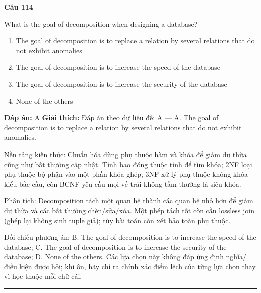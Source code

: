 \documentclass[11pt,a4paper]{article}
\newenvironment{question}[1]{%
  \par\vspace{1em}\noindent\textbf{\large Câu #1}\par\vspace{0.4em}
}{%
  \par\vspace{1em}\hrule\vspace{0.6em}
}
\newenvironment{choices}{%
  \begin{enumerate}[label=\textbf{\Alph*.},leftmargin=2.2em,itemsep=2pt,topsep=3pt]
}{%
  \end{enumerate}
}
\newcommand{\choice}{\item}
\begin{document}
\begin{question}{114}
What is the goal of decomposition when designing a database?
\begin{choices}
\choice The goal of decomposition is to replace a relation by several relations that do not exhibit anomalies
\choice The goal of decomposition is to increase the speed of the database
\choice The goal of decomposition is to increase the security of the database
\choice None of the others
\end{choices}
\textbf{Đáp án:} A
\textbf{Giải thích:} Đáp án theo dữ liệu đề: A — A. The goal of decomposition is to replace a relation by several relations that do not exhibit anomalies.

Nền tảng kiến thức: Chuẩn hóa dùng phụ thuộc hàm và khóa để giảm dư thừa cũng như bất thường cập nhật. Tính bao đóng thuộc tính để tìm khóa; 2NF loại phụ thuộc bộ phận vào một phần khóa ghép, 3NF xử lý phụ thuộc không khóa kiểu bắc cầu, còn BCNF yêu cầu mọi vế trái không tầm thường là siêu khóa.

Phân tích: Decomposition tách một quan hệ thành các quan hệ nhỏ hơn để giảm dư thừa và các bất thường chèn/sửa/xóa. Một phép tách tốt còn cần lossless join (ghép lại không sinh tuple giả); tùy bài toán còn xét bảo toàn phụ thuộc.

Đối chiếu phương án: B. The goal of decomposition is to increase the speed of the database; C. The goal of decomposition is to increase the security of the database; D. None of the others. Các lựa chọn này không đáp ứng định nghĩa/điều kiện được hỏi; khi ôn, hãy chỉ ra chính xác điểm lệch của từng lựa chọn thay vì học thuộc mỗi chữ cái.
\end{question}
\end{document}
